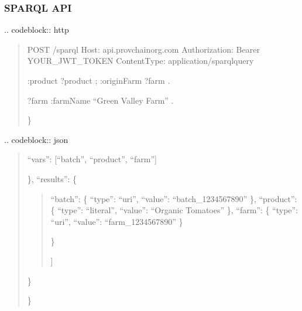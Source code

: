 \documentclass[letterpaper,10pt,english]{sphinxmanual}
\begin{document}
\subsubsection{SPARQL API}
\label{\detokenize{api/index:sparql-api}}
\sphinxAtStartPar
{}
.. code\sphinxhyphen{}block:: http
\begin{quote}

\sphinxAtStartPar
POST /sparql
Host: api.provchain\sphinxhyphen{}org.com
Authorization: Bearer YOUR\_JWT\_TOKEN
Content\sphinxhyphen{}Type: application/sparql\sphinxhyphen{}query
\begin{description}
\begin{description}
\sphinxAtStartPar
:product ?product ;
:originFarm ?farm .

\end{description}

\sphinxAtStartPar
?farm :farmName “Green Valley Farm” .

\end{description}

\sphinxAtStartPar
\}
\end{quote}

\sphinxAtStartPar
{}
.. code\sphinxhyphen{}block:: json
\begin{quote}
\begin{description}
\sphinxlineitem{\{}\begin{description}
\sphinxAtStartPar
“vars”: {[}“batch”, “product”, “farm”{]}

\end{description}

\sphinxAtStartPar
\},
“results”: \{
\begin{quote}
\begin{description}
\sphinxlineitem{“bindings”: {[}}\begin{description}
\sphinxlineitem{\{}
\sphinxAtStartPar
“batch”: \{ “type”: “uri”, “value”: “batch\_1234567890” \},
“product”: \{ “type”: “literal”, “value”: “Organic Tomatoes” \},
“farm”: \{ “type”: “uri”, “value”: “farm\_1234567890” \}

\end{description}

\sphinxAtStartPar
\}

\end{description}

\sphinxAtStartPar
{]}
\end{quote}

\sphinxAtStartPar
\}

\end{description}

\sphinxAtStartPar
\}
\end{quote}
\end{document}
